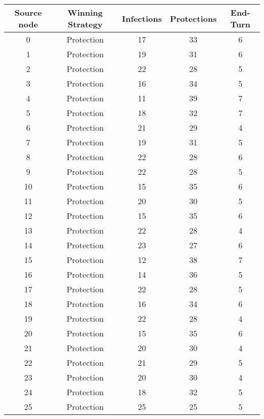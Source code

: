 \documentclass[results.tex]{subfiles}
\begin{document}
\begin{center}
  \begin{tabular}{| c || c | c | c | c |}
    \hline
    {\bfseries Source node} & {\bfseries Winning Strategy} & {\bfseries Infections} & {\bfseries Protections} & {\bfseries End-Turn} \\  %
    \hline\hline
    0 & Protection & 17 & 33 & 6 \\ 
    \hline
    1 & Protection & 19 & 31 & 6 \\ 
    \hline
    2 & Protection & 22 & 28 & 5 \\ 
    \hline
    3 & Protection & 16 & 34 & 5 \\ 
    \hline
    4 & Protection & 11 & 39 & 7 \\ 
    \hline
    5 & Protection & 18 & 32 & 7 \\ 
    \hline
    6 & Protection & 21 & 29 & 4 \\ 
    \hline
    7 & Protection & 19 & 31 & 5 \\ 
    \hline
    8 & Protection & 22 & 28 & 6 \\ 
    \hline
    9 & Protection & 22 & 28 & 5 \\ 
    \hline
    10 & Protection & 15 & 35 & 6 \\ 
    \hline
    11 & Protection & 20 & 30 & 5 \\ 
    \hline
    12 & Protection & 15 & 35 & 6 \\ 
    \hline
    13 & Protection & 22 & 28 & 4 \\ 
    \hline
    14 & Protection & 23 & 27 & 6 \\ 
    \hline
    15 & Protection & 12 & 38 & 7 \\ 
    \hline
    16 & Protection & 14 & 36 & 5 \\ 
    \hline
    17 & Protection & 22 & 28 & 5 \\ 
    \hline
    18 & Protection & 16 & 34 & 6 \\ 
    \hline
    19 & Protection & 22 & 28 & 4 \\ 
    \hline
    20 & Protection & 15 & 35 & 6 \\ 
    \hline
    21 & Protection & 20 & 30 & 4 \\ 
    \hline
    22 & Protection & 21 & 29 & 5 \\ 
    \hline
    23 & Protection & 20 & 30 & 4 \\ 
    \hline
    24 & Protection & 18 & 32 & 5 \\ 
    \hline
    25 & Protection & 25 & 25 & 5 \\ 

\end{tabular}
\end{center}
\end{document}
